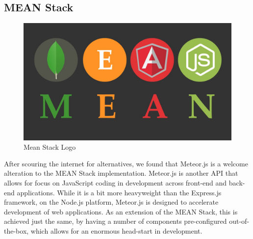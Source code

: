 \documentclass[12pt,a4paper]{report}
\begin{document}
		\subsection{MEAN Stack}
		\begin{figure}[H]
			\centering
			\includegraphics[scale=.2]{meanStack}
			\caption{Mean Stack Logo}
			\label{fig: Mean Stack Logo}
		\end{figure}
		After scouring the internet for alternatives, we found that Meteor.js is a welcome alteration to the MEAN Stack implementation. Meteor.js is another API that allows for focus on JavaScript coding in development across front-end and back-end applications. While it is a bit more heavyweight than the Express.js framework, on the Node.js platform, Meteor.js is designed to accelerate development of web applications. As an extension of the MEAN Stack, this is achieved just the same, by having a number of components pre-configured out-of-the-box, which allows for an enormous head-start in development.
			\newpage
\end{document}
